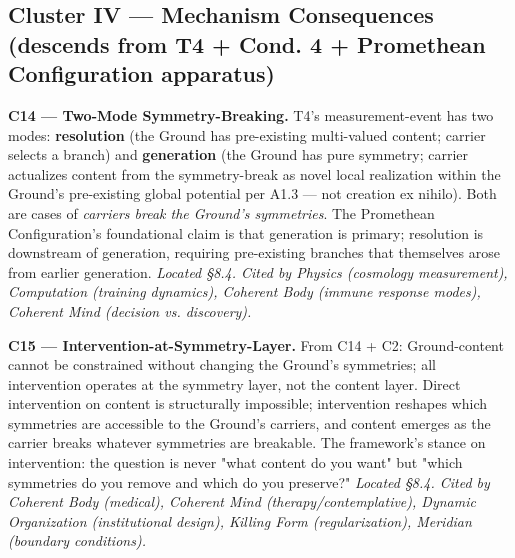 \documentclass[11pt, openany]{book}
\begin{document}
\subsection{Cluster IV --- Mechanism Consequences (descends from T4 + Cond. 4 + Promethean Configuration apparatus)}

\textbf{C14 --- Two-Mode Symmetry-Breaking.} T4's measurement-event has two modes: \textbf{resolution} (the Ground has pre-existing multi-valued content; carrier selects a branch) and \textbf{generation} (the Ground has pure symmetry; carrier actualizes content from the symmetry-break as novel local realization within the Ground's pre-existing global potential per A1.3 --- not creation ex nihilo). Both are cases of \textit{carriers break the Ground's symmetries}. The Promethean Configuration's foundational claim is that generation is primary; resolution is downstream of generation, requiring pre-existing branches that themselves arose from earlier generation. \textit{Located §8.4. Cited by Physics (cosmology measurement), Computation (training dynamics), Coherent Body (immune response modes), Coherent Mind (decision vs. discovery).}

\textbf{C15 --- Intervention-at-Symmetry-Layer.} From C14 + C2: Ground-content cannot be constrained without changing the Ground's symmetries; all intervention operates at the symmetry layer, not the content layer. Direct intervention on content is structurally impossible; intervention reshapes which symmetries are accessible to the Ground's carriers, and content emerges as the carrier breaks whatever symmetries are breakable. The framework's stance on intervention: the question is never "what content do you want" but "which symmetries do you remove and which do you preserve?" \textit{Located §8.4. Cited by Coherent Body (medical), Coherent Mind (therapy/contemplative), Dynamic Organization (institutional design), Killing Form (regularization), Meridian (boundary conditions).}
\end{document}

